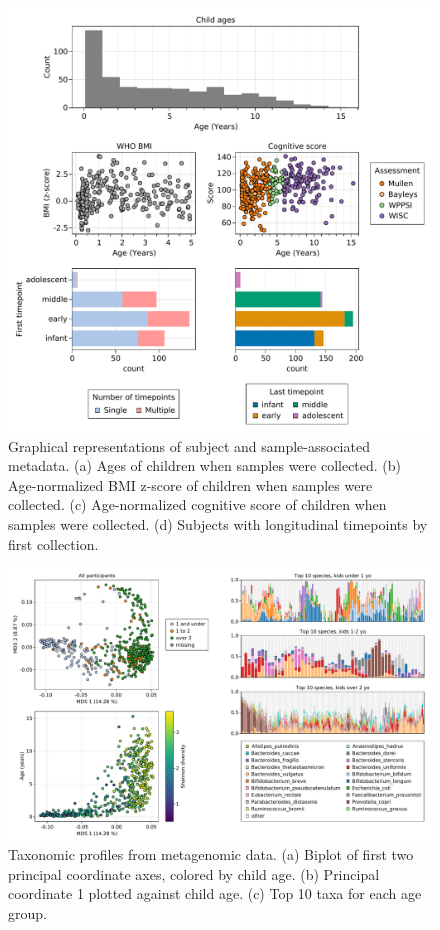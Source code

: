 \documentclass[fleqn,10pt]{wlscirep}
\begin{document}
\begin{figure}[ht]
\centering
\includegraphics[width=\linewidth]{../figures/05_data_summaries}
\caption{
    Graphical representations of subject and sample-associated metadata.
    (a) Ages of children when samples were collected.
    (b) Age-normalized BMI z-score of children when samples were collected.
    (c) Age-normalized cognitive score of children when samples were collected.
    (d) Subjects with longitudinal timepoints by first collection.
}
\label{fig:data}
\end{figure}

\begin{figure}[ht]
\centering
\includegraphics[width=\linewidth]{../figures/03_taxonomic_profiles}
\caption{
    Taxonomic profiles from metagenomic data.
    (a) Biplot of first two principal coordinate axes, colored by child age.
    (b) Principal coordinate 1 plotted against child age.
    (c) Top 10 taxa for each age group.
}
\label{fig:taxonomic}
\end{figure}
\end{document}

